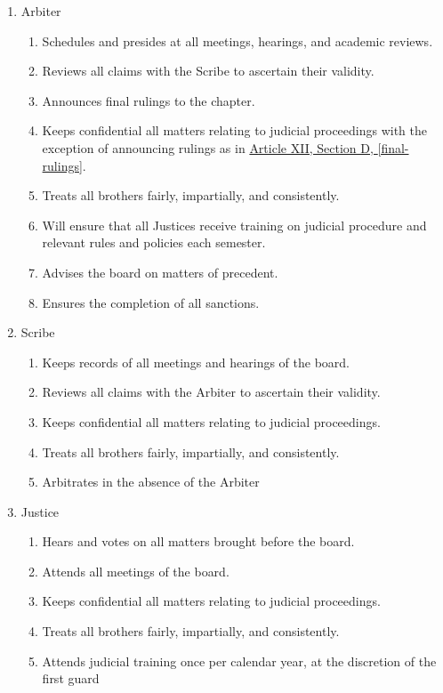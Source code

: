 	\begin{enumerate}

		\item Arbiter
			\begin{enumerate}
				\item Schedules and presides at all meetings, hearings, and academic reviews.
				\item Reviews all claims with the Scribe to ascertain their validity.
				\item Announces final rulings to the chapter. \label{final-rulings}
				\item Keeps confidential all matters relating to judicial proceedings with the exception of announcing rulings as in \hyperref[final-rulings]{Article XII, Section D, \autoref*{final-rulings}}. 
				\item Treats all brothers fairly, impartially, and consistently.
				\item Will ensure that all Justices receive training on judicial procedure and relevant rules and policies each semester.
				\item Advises the board on matters of precedent.
				\item Ensures the completion of all sanctions.
			\end{enumerate}

		\item Scribe
			\begin{enumerate}
				\item Keeps records of all meetings and hearings of the board.
				\item Reviews all claims with the Arbiter to ascertain their validity.
				\item Keeps confidential all matters relating to judicial proceedings.
				\item Treats all brothers fairly, impartially, and consistently.
				\item Arbitrates in the absence of the Arbiter
			\end{enumerate}

		\item Justice
			\begin{enumerate}
				\item Hears and votes on all matters brought before the board.
				\item Attends all meetings of the board.
				\item Keeps confidential all matters relating to judicial proceedings.
				\item Treats all brothers fairly, impartially, and consistently.
				\item Attends judicial training once per calendar year, at the discretion of the first guard 
			\end{enumerate}


\end{enumerate}
